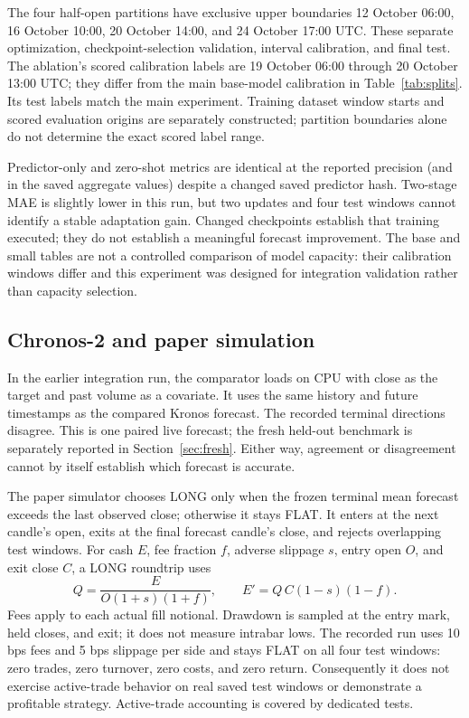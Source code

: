\documentclass[11pt,a4paper]{article}
\newcommand{\code}[1]{\texttt{\detokenize{#1}}}
\begin{document}
The four half-open partitions have exclusive upper boundaries 12 October
06:00, 16 October 10:00, 20 October 14:00, and 24 October 17:00 UTC. These
separate optimization, checkpoint-selection validation, interval calibration,
and final test. The ablation's scored calibration labels are 19 October 06:00
through 20 October 13:00 UTC; they differ from the main base-model calibration
in Table~\ref{tab:splits}. Its test labels match the main experiment. Training
dataset window starts and scored evaluation origins are separately constructed;
partition boundaries alone do not determine the exact scored label range.

\begin{table}[htbp]
\centering\small

\caption{Separate Kronos-small ablation. P/T mean predictor/tokenizer optimizer
updates. MAE/RMSE are USDT; raw and expanded coverage are percent. All rows use
four held-out test windows.}
\label{tab:ablation}
\end{table}
Predictor-only and zero-shot metrics are identical at the reported precision
(and in the saved aggregate values) despite a changed saved predictor hash.
Two-stage MAE is slightly lower in this run, but two updates and four test
windows cannot identify a stable adaptation gain. Changed checkpoints establish
that training executed; they do not establish a meaningful forecast improvement.
The base and small tables are not a controlled comparison of model capacity:
their calibration windows differ and this experiment was designed for integration
validation rather than capacity selection.

\subsection{Chronos-2 and paper simulation}
In the earlier integration run, the comparator loads \code{amazon/chronos-2} on CPU with close as the target and
past volume as a covariate. It uses the same history and future timestamps as
the compared Kronos forecast. The recorded terminal directions disagree. This
is one paired live forecast; the fresh held-out benchmark is separately reported
in Section~\ref{sec:fresh}. Either way,
agreement or disagreement cannot by itself establish which forecast is accurate.

The paper simulator chooses LONG only when the frozen terminal mean forecast
exceeds the last observed close; otherwise it stays FLAT. It enters at the next
candle's open, exits at the final forecast candle's close, and rejects overlapping
test windows. For cash $E$, fee fraction $f$, adverse slippage $s$, entry open
$O$, and exit close $C$, a LONG roundtrip uses
\[
 Q=\frac{E}{O(1+s)(1+f)},\qquad E'=Q\,C(1-s)(1-f).
\]
Fees apply to each actual fill notional. Drawdown is sampled at the entry mark,
held closes, and exit; it does not measure intrabar lows. The recorded run uses
10 bps fees and 5 bps slippage per side and stays FLAT on all four test windows:
zero trades, zero turnover, zero costs, and zero return. Consequently it does
not exercise active-trade behavior on real saved test windows or demonstrate a
profitable strategy. Active-trade accounting is covered by dedicated tests.
\end{document}
